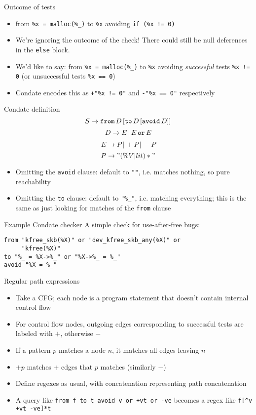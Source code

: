 \documentclass{beamer}
\begin{document}
\begin{frame}{Outcome of tests}
\begin{itemize}
\item from {\tt \%x = malloc(\%\_)} to {\tt *\%x} avoiding {\tt if (\%x != 0)}
\item We're ignoring the outcome of the check! There could still be null
deferences in the {\tt else} block.
\item We'd like to say: from {\tt \%x = malloc(\%\_)} to {\tt *\%x} avoiding \emph{successful} tests {\tt \%x != 0} (or unsuccessful tests {\tt \%x == 0})
\item Condate encodes this as {\tt +"\%x != 0"} and {\tt -"\%x == 0"}
respectively
\end{itemize}
\end{frame}

\begin{frame}{Condate definition}
$$ S \rightarrow {\tt from} \, D \,  [{\tt to} \, D \, [{\tt avoid} \, D]] $$
$$ D \rightarrow E \, | \, E \, {\tt or } \, E $$
$$ E \rightarrow P \, | \, +P \, | \, -P $$
$$ P \rightarrow "(\%V | lit)*" $$
\pause
\begin{itemize}
\item Omitting the {\tt avoid} clause: default to {\tt ""}, i.e. matches
nothing, so pure reachability
\item Omitting the {\tt to} clause: default to {\tt "\%\_"}, i.e. matching
everything; this is the same as just looking for matches of the {\tt from}
clause
\end{itemize}
\end{frame}

\begin{frame}[fragile]{Example Condate checker}
A simple check for use-after-free bugs:
\begin{verbatim}
from "kfree_skb(%X)" or "dev_kfree_skb_any(%X)" or 
     "kfree(%X)"
to "%_ = %X->%_" or "%X->%_ = %_"
avoid "%X = %_"
\end{verbatim}
\end{frame}

\begin{frame}{Regular path expressions}
\begin{itemize}
\item Take a CFG; each node is a program statement that doesn't contain internal control flow
\item For control flow nodes, outgoing edges corresponding to successful tests are labeled with $+$, otherwise $-$
\item If a pattern $p$ matches a node $n$, it matches all edges leaving $n$
\item $+p$ matches $+$ edges that $p$ matches (similarly $-$)
\item Define regexes as usual, with concatenation representing path
concatenation
\item A query like {\tt from f to t avoid v or +vt or -ve} becomes a regex like {\tt f[\textasciicircum v +vt -ve]*t}
\end{itemize}
\end{frame}
\end{document}
